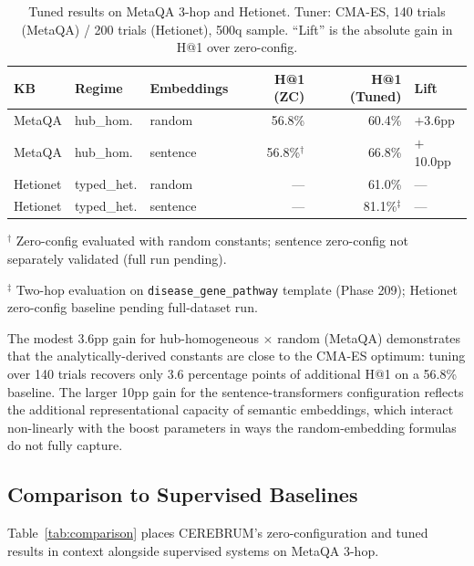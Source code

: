 \documentclass[11pt,a4paper]{article}
\begin{document}
\begin{table}[t]
\centering
\caption{%
  Tuned results on MetaQA 3-hop and Hetionet.
  Tuner: CMA-ES, 140 trials (MetaQA) / 200 trials (Hetionet), 500q sample.
  ``Lift'' is the absolute gain in H@1 over zero-config.
}
\label{tab:tuned}
\begin{tabular}{lllrrl}
\toprule
\textbf{KB} & \textbf{Regime} & \textbf{Embeddings}
  & \textbf{H@1 (ZC)} & \textbf{H@1 (Tuned)} & \textbf{Lift} \\
\midrule
MetaQA   & hub\_hom.   & random   & 56.8\% & 60.4\% & $+$3.6pp \\
MetaQA   & hub\_hom.   & sentence & 56.8\%$^\dagger$ & 66.8\% & $+$10.0pp \\
Hetionet & typed\_het. & random   & ---    & 61.0\% & --- \\
Hetionet & typed\_het. & sentence & ---    & 81.1\%$^\ddagger$ & --- \\
\bottomrule
\end{tabular}
\begin{tablenotes}
  \small
  \item $^\dagger$ Zero-config evaluated with random constants; sentence
    zero-config not separately validated (full run pending).
  \item $^\ddagger$ Two-hop evaluation on \texttt{disease\_gene\_pathway}
    template (Phase 209); Hetionet zero-config baseline pending full-dataset run.
\end{tablenotes}
\end{table}

The modest 3.6pp gain for hub-homogeneous $\times$ random (MetaQA)
demonstrates that the analytically-derived constants are close to the
CMA-ES optimum: tuning over 140 trials recovers only 3.6 percentage points
of additional H@1 on a 56.8\% baseline.
The larger 10pp gain for the sentence-transformers configuration reflects
the additional representational capacity of semantic embeddings, which
interact non-linearly with the boost parameters in ways the random-embedding
formulas do not fully capture.

\subsection{Comparison to Supervised Baselines}

Table~\ref{tab:comparison} places CEREBRUM's zero-configuration and tuned
results in context alongside supervised systems on MetaQA 3-hop.
\end{document}

